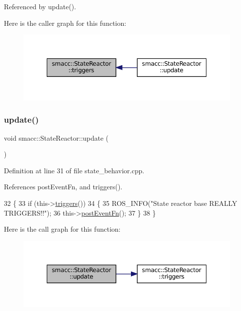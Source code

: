 Referenced by update().

Here is the caller graph for this function\+:
\nopagebreak
\begin{figure}[H]
\begin{center}
\leavevmode
\includegraphics[width=348pt]{classsmacc_1_1StateReactor_a445bc3c90980d75d7d815b85cfb68b21_icgraph}
\end{center}
\end{figure}
\mbox{\label{classsmacc_1_1StateReactor_aca5d4f7af06532272db55943b7810a43}} 
\subsubsection{\texorpdfstring{update()}{update()}}
{\footnotesize\ttfamily void smacc\+::\+State\+Reactor\+::update (\begin{DoxyParamCaption}{ }\end{DoxyParamCaption})}



Definition at line 31 of file state\+\_\+behavior.\+cpp.



References post\+Event\+Fn, and triggers().


\begin{DoxyCode}
32 \{
33     \textcolor{keywordflow}{if} (this->\hyperlink{classsmacc_1_1StateReactor_a445bc3c90980d75d7d815b85cfb68b21}{triggers}())
34     \{
35         ROS\_INFO(\textcolor{stringliteral}{"State reactor base REALLY TRIGGERS!!"});
36         this->\hyperlink{classsmacc_1_1StateReactor_a1d97ae5c1689b6716c60c19c94a7eeae}{postEventFn}();
37     \}
38 \}
\end{DoxyCode}
Here is the call graph for this function\+:
\nopagebreak
\begin{figure}[H]
\begin{center}
\leavevmode
\includegraphics[width=348pt]{classsmacc_1_1StateReactor_aca5d4f7af06532272db55943b7810a43_cgraph}
\end{center}
\end{figure}


